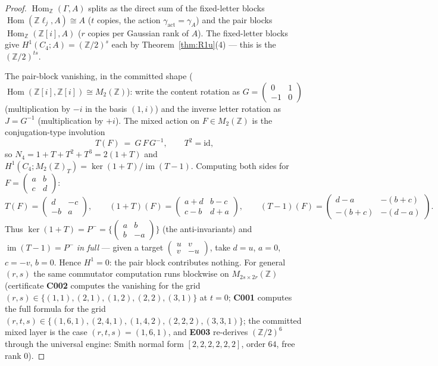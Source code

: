 \documentclass[11pt]{article}
\newcommand{\Img}{\operatorname{im}}
\newcommand{\Z}{\mathbb Z}
\newcommand{\Hom}{\operatorname{Hom}}
\begin{document}
\begin{proof}
$\Hom_\Z(\Gamma,A)$ splits as the direct sum of the fixed-letter
blocks $\Hom(\Z\ell_j,A)\cong A$ ($t$ copies, the action
$\gamma_{\mathrm{act}}=\gamma_A$) and the pair blocks
$\Hom_\Z(\Z[i],A)$ ($r$ copies per Gaussian rank of $A$). The
fixed-letter blocks give $H^1(C_4;A)=(\Z/2)^s$ each by
Theorem~\ref{thm:R1u}(4) --- this is the $(\Z/2)^{ts}$.

The pair-block vanishing, in the committed shape
($\Hom(\Z[i],\Z[i])\cong M_2(\Z)$): write the content rotation as
$G=\left(\begin{smallmatrix}0&1\\-1&0\end{smallmatrix}\right)$
(multiplication by $-i$ in the basis $(1,i)$) and the inverse letter
rotation as $J=G^{-1}$ (multiplication by $+i$). The mixed action on
$F\in M_2(\Z)$ is the conjugation-type involution
\[
T(F)\ =\ G\,F\,G^{-1},\qquad T^2=\mathrm{id},
\]
so $N_4=1+T+T^2+T^3=2(1+T)$ and
$H^1(C_4;M_2(\Z)_T)=\ker(1+T)/\Img(T-1)$. Computing both sides for
$F=\left(\begin{smallmatrix}a&b\\c&d\end{smallmatrix}\right)$:
\[
T(F)=\begin{pmatrix}d&-c\\-b&a\end{pmatrix},\qquad
(1+T)(F)=\begin{pmatrix}a+d&b-c\\c-b&d+a\end{pmatrix},\qquad
(T-1)(F)=\begin{pmatrix}d-a&-(b+c)\\-(b+c)&-(d-a)\end{pmatrix}.
\]
Thus $\ker(1+T)=P^-=\{\left(\begin{smallmatrix}a&b\\b&-a\end{smallmatrix}\right)\}$
(the anti-invariants) and $\Img(T-1)=P^-$ \emph{in full} --- given a
target $\left(\begin{smallmatrix}u&v\\v&-u\end{smallmatrix}\right)$,
take $d=u$, $a=0$, $c=-v$, $b=0$. Hence $H^1=0$: the pair block
contributes nothing. For general $(r,s)$ the same commutator
computation runs blockwise on $M_{2s\times2r}(\Z)$ (certificate
\textbf{C002} computes the vanishing for the grid
$(r,s)\in\{(1,1),(2,1),(1,2),(2,2),(3,1)\}$ at $t=0$; \textbf{C001}
computes the full formula for the grid
$(r,t,s)\in\{(1,6,1),(2,4,1),(1,4,2),(2,2,2),(3,3,1)\}$; the committed
mixed layer is the case $(r,t,s)=(1,6,1)$, and
\textbf{E003} re-derives $(\Z/2)^6$ through the universal engine:
Smith normal form $[2,2,2,2,2,2]$, order $64$, free rank $0$).
\end{proof}
\end{document}
